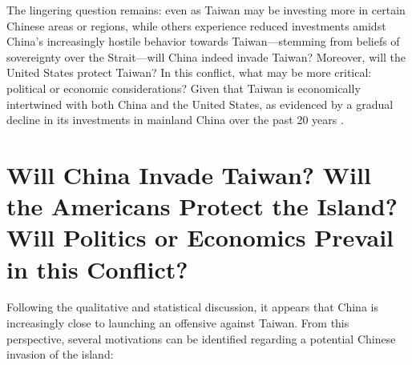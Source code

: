 \documentclass{article}
\begin{document}
The lingering question remains: even as Taiwan may be investing more in certain Chinese areas or regions, while others experience reduced investments amidst China's increasingly hostile behavior towards Taiwan—stemming from beliefs of sovereignty over the Strait—will China indeed invade Taiwan? Moreover, will the United States protect Taiwan? In this conflict, what may be more critical: political or economic considerations? Given that Taiwan is economically intertwined with both China and the United States, as evidenced by a gradual decline in its investments in mainland China over the past 20 years \citep{pietrafesa_political_economic_relations_china_taiwan_usa}.

\section{Will China Invade Taiwan? Will the Americans Protect the Island? Will Politics or Economics Prevail in this Conflict?}

Following the qualitative and statistical discussion, it appears that China is increasingly close to launching an offensive against Taiwan. From this perspective, several motivations can be identified regarding a potential Chinese invasion of the island:
\end{document}
